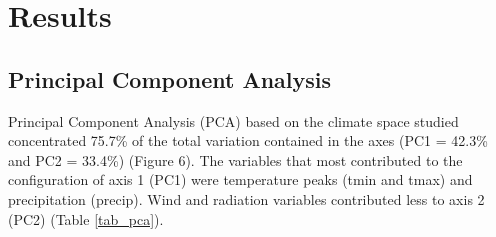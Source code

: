 




\section{Results}
\label{results}

\iffalse

\subsection{Principal Component Analysis}

Principal Component Analysis (PCA) based on the climate space studied concentrated 75.7\% of the total variation contained in the axes (PC1 = 42.3\% and PC2 = 33.4\%) (Figure 6). The variables that most contributed to the configuration of axis 1 (PC1) were temperature peaks (tmin and tmax) and precipitation (precip). Wind and radiation variables contributed less to axis 2 (PC2) (Table \ref{tab_pca}).

